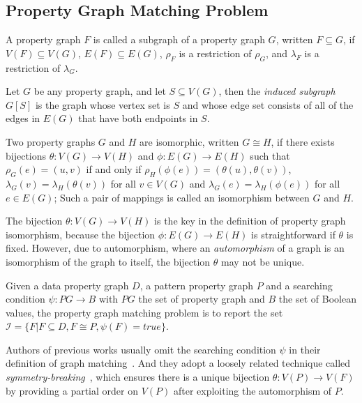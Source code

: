 \subsection{Property Graph Matching Problem}
\begin{definition}[Subgraph]
  A property graph $F$ is called a subgraph of a property graph $G$, written $F \subseteq G$, if
  $V(F) \subseteq V(G)$, $E(F) \subseteq E(G)$, $\rho_F$ is a restriction of $\rho_G$, and $\lambda_F$ is a restriction of $\lambda_G$.
\end{definition}
Let $G$ be any property graph, and let $S \subseteq V(G)$, then the \emph{induced subgraph} $G[S]$ is the graph whose vertex set is $S$ and whose edge set consists of all of the edges in $E(G)$ that have both endpoints in $S$.
\begin{definition}
  Two property graphs $G$ and $H$ are isomorphic, written $G \cong H$,
  if there exists bijections $\theta: V(G) \rightarrow V(H)$ and $\phi: E(G) \rightarrow E(H)$ such that
  $\rho_G(e) = (u, v)$ if and only if $\rho_H(\phi(e)) = (\theta(u), \theta(v))$,
  $\lambda_G(v) = \lambda_H(\theta(v))$ for all $v \in V(G)$
  and $\lambda_G(e) = \lambda_H(\phi(e))$ for all $e \in E(G)$;
  Such a pair of mappings is called an isomorphism between $G$ and $H$.
\end{definition}
The bijection $\theta: V(G) \rightarrow V(H)$ is the key in the definition of property graph isomorphism,
because the bijection $\phi: E(G) \rightarrow E(H)$ is straightforward if $\theta$ is fixed.
However, due to automorphism, where an \emph{automorphism} of a graph is an isomorphism of the graph to itself,
the bijection $\theta$ may not be unique.
\begin{definition}\label{def:property_graph_matching}
  Given a data property graph $D$, a pattern property graph $P$ and a searching condition $\psi: PG \rightarrow B$ with $PG$ the set of property graph and $B$ the set of Boolean values,
  the property graph matching problem is to report the set $\mathcal{I} = \{F | F \subseteq D, F \cong P, \psi(F) = true\}$.
\end{definition}
Authors of previous works usually omit the searching condition $\psi$ in their definition of graph matching~\cite{DBLP:conf/sigmod/ShaoCCMYX14,DBLP:journals/pvldb/LaiQLC15,DBLP:conf/sigmod/KimLBHLKJ16,DBLP:journals/pvldb/QiaoZC17}.
And they adopt a loosely related technique called \emph{symmetry-breaking}~\cite{DBLP:conf/recomb/GrochowK07},
which ensures there is a unique bijection $\theta: V(P) \rightarrow V(F)$ by providing a partial order on $V(P)$ after exploiting the automorphism of $P$.
